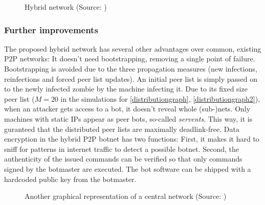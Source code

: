 \documentclass{llncs}
\begin{document}
\begin{figure}[htbp]
  \centering
  \caption{Hybrid network (Source: \cite{td1sc})}
  \label{hybrid-network}
\end{figure}

\subsubsection{Further improvements}

The proposed hybrid network has several other advantages over common,
existing P2P networks: It doesn't need bootstrapping, removing a
single point of failure. Bootstrapping is avoided due to the three
propagation measures (new infections, reinfections and forced peer
list updates). An initial peer list is simply passed on to the newly
infected zombie by the machine infecting it. Due to its fixed size
peer list ($M=20$ in the simulations for \ref{distributiongraph},
\ref{distributiongraph2}), when an attacker gets access to a bot, it
doesn't reveal whole (sub-)nets.  Only machines with static IPs appear
as peer bots, so-called {\it servents}. This way, it is guranteed that
the distributed peer lists are maximally deadlink-free. Data
encryption in the hybrid P2P botnet has two functions: First, it makes
it hard to sniff for patterns in internet traffic to detect a possible
botnet. Second, the authenticity of the issued commands can be
verified so that only commands signed by the botmaster are
executed. The bot software can be shipped with a hardcoded public key
from the botmaster.

\begin{figure}[htbp]
  \centering
  \caption{Another graphical representation of a central network (Source: \cite{td1sc})}
  \label{central-network2}
\end{figure}
\end{document}
